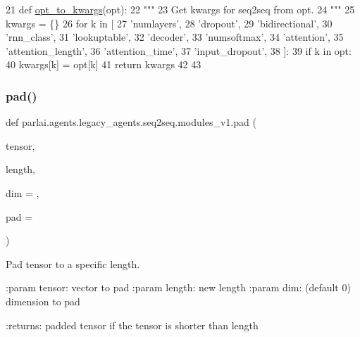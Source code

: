 \begin{DoxyCode}
21 \textcolor{keyword}{def }\hyperlink{namespaceparlai_1_1agents_1_1legacy__agents_1_1seq2seq_1_1modules__v1_af13e3733abb5828b0c0a75d95833441c}{opt\_to\_kwargs}(opt):
22     \textcolor{stringliteral}{"""}
23 \textcolor{stringliteral}{    Get kwargs for seq2seq from opt.}
24 \textcolor{stringliteral}{    """}
25     kwargs = \{\}
26     \textcolor{keywordflow}{for} k \textcolor{keywordflow}{in} [
27         \textcolor{stringliteral}{'numlayers'},
28         \textcolor{stringliteral}{'dropout'},
29         \textcolor{stringliteral}{'bidirectional'},
30         \textcolor{stringliteral}{'rnn\_class'},
31         \textcolor{stringliteral}{'lookuptable'},
32         \textcolor{stringliteral}{'decoder'},
33         \textcolor{stringliteral}{'numsoftmax'},
34         \textcolor{stringliteral}{'attention'},
35         \textcolor{stringliteral}{'attention\_length'},
36         \textcolor{stringliteral}{'attention\_time'},
37         \textcolor{stringliteral}{'input\_dropout'},
38     ]:
39         \textcolor{keywordflow}{if} k \textcolor{keywordflow}{in} opt:
40             kwargs[k] = opt[k]
41     \textcolor{keywordflow}{return} kwargs
42 
43 
\end{DoxyCode}
\mbox{\label{namespaceparlai_1_1agents_1_1legacy__agents_1_1seq2seq_1_1modules__v1_ab71a48e82c903a3a22ff0b000c461922}} 
\subsubsection{\texorpdfstring{pad()}{pad()}}
{\footnotesize\ttfamily def parlai.\+agents.\+legacy\+\_\+agents.\+seq2seq.\+modules\+\_\+v1.\+pad (\begin{DoxyParamCaption}\item[{}]{tensor,  }\item[{}]{length,  }\item[{}]{dim = {},  }\item[{}]{pad = {} }\end{DoxyParamCaption})}

\begin{DoxyVerb}Pad tensor to a specific length.

:param tensor: vector to pad
:param length: new length
:param dim: (default 0) dimension to pad

:returns: padded tensor if the tensor is shorter than length
\end{DoxyVerb}
 


